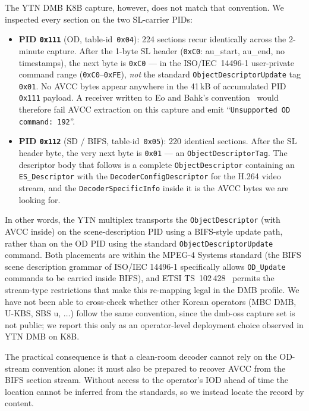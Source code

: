 \documentclass[11pt,a4paper]{article}
\begin{document}
The YTN DMB K8B capture, however, does not match that convention.
We inspected every section on the two SL-carrier PIDs:

\begin{itemize}[leftmargin=*,nosep]
\item \textbf{PID \texttt{0x111}} (OD, table-id~\texttt{0x04}):
      224 sections recur identically across the 2-minute capture.
      After the 1-byte SL header (\texttt{0xC0}: au\_start, au\_end,
      no timestamps), the next byte is \texttt{0xC0} --- in the
      ISO/IEC~14496-1 user-private command range
      (\texttt{0xC0}--\texttt{0xFE}), \emph{not} the standard
      \texttt{ObjectDescriptorUpdate} tag \texttt{0x01}.  No AVCC
      bytes appear anywhere in the 41\,kB of accumulated PID
      \texttt{0x111} payload.  A receiver written to Eo and
      Bahk's convention~\cite{eo2024tdmb} would therefore fail
      AVCC extraction on this capture and emit
      ``\texttt{Unsupported OD command: 192}''.
\item \textbf{PID \texttt{0x112}} (SD / BIFS, table-id~\texttt{0x05}):
      220 identical sections.  After the SL header byte, the very
      next byte is \texttt{0x01} --- an
      \texttt{ObjectDescriptorTag}.  The descriptor body that
      follows is a complete \texttt{ObjectDescriptor} containing an
      \texttt{ES\_Descriptor} with the
      \texttt{DecoderConfigDescriptor} for the H.264 video stream,
      and the \texttt{DecoderSpecificInfo} inside it is the AVCC
      bytes we are looking for.
\end{itemize}

In other words, the YTN multiplex transports the
\texttt{ObjectDescriptor} (with AVCC inside) on the scene-description
PID using a BIFS-style update path, rather than on the OD PID using
the standard \texttt{ObjectDescriptorUpdate} command.  Both
placements are within the MPEG-4 Systems standard (the BIFS scene
description grammar of ISO/IEC 14496-1 specifically allows
\texttt{OD\_Update} commands to be carried inside BIFS), and ETSI
TS~102\,428~\cite{etsi102428} permits the stream-type restrictions
that make this re-mapping legal in the DMB profile.  We have not
been able to cross-check whether other Korean operators
(MBC DMB, U-KBS, SBS u, $\ldots$) follow the same convention, since
the dmb-oss capture set is not public; we report this only as an
operator-level deployment choice observed in YTN DMB on K8B.

The practical consequence is that a clean-room decoder cannot rely
on the OD-stream convention alone: it must also be prepared to
recover AVCC from the BIFS section stream.  Without access to the
operator's IOD ahead of time the location cannot be inferred from
the standards, so we instead locate the record by content.
\end{document}
